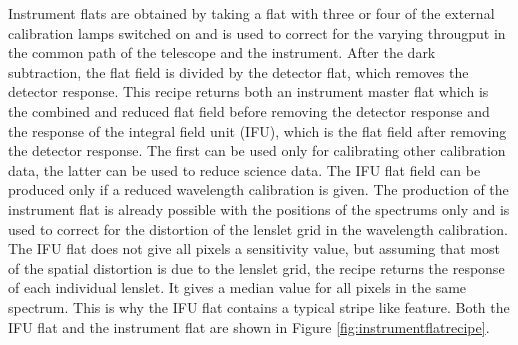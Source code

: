 \documentclass[twoside,single,12pt]{lion-msc}
\begin{document}
Instrument flats are obtained by taking a flat with three or four of the external calibration lamps switched on and is used to correct for the varying througput in the common path of the telescope and the instrument. After the dark subtraction, the flat field is divided by the detector flat, which removes the detector response. This recipe returns both an instrument master flat which is the combined and reduced flat field before removing the detector response and the response of the integral field unit (IFU), which is the flat field after removing the detector response. The first can be used only for calibrating other calibration data, the latter can be used to reduce science data. The IFU flat field can be produced only if a reduced wavelength calibration is given. The production of the instrument flat is already possible with the positions of the spectrums only and is used to correct for the distortion of the lenslet grid in the wavelength calibration. The IFU flat does not give all pixels a sensitivity value, but assuming that most of the spatial distortion is due to the lenslet grid, the recipe returns the response of each individual lenslet. It gives a median value for all pixels in the same spectrum. This is why the IFU flat contains a typical stripe like feature. Both the IFU flat and the instrument flat are shown in Figure \ref{fig:instrumentflatrecipe}. 
\end{document}
